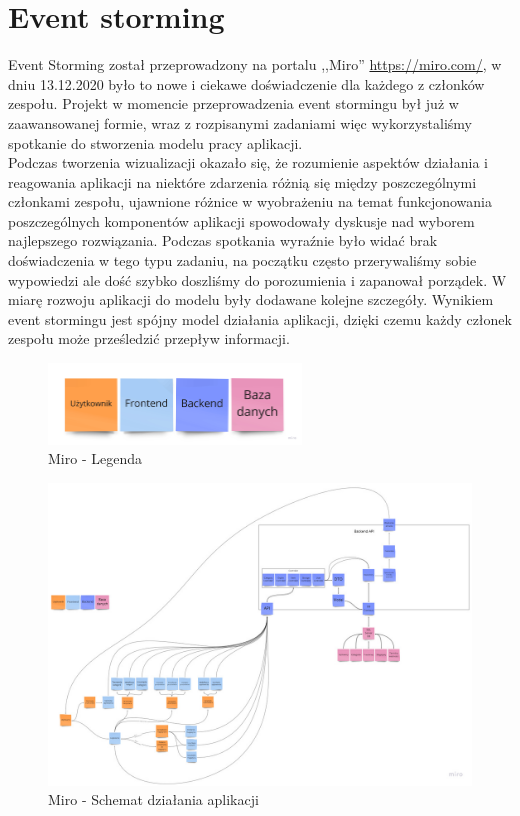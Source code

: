 \documentclass[12pt,a4paper]{article}
\begin{document}
	\section{Event storming}
		\indent Event Storming został przeprowadzony na portalu ,,Miro'' \url{https://miro.com/}, w dniu 13.12.2020 było to nowe i ciekawe doświadczenie dla każdego z członków zespołu.
		Projekt w momencie przeprowadzenia event stormingu był już w zaawansowanej formie, wraz z rozpisanymi zadaniami więc wykorzystaliśmy spotkanie
		do stworzenia modelu pracy aplikacji.\\
		\indent Podczas tworzenia wizualizacji okazało się, że rozumienie aspektów działania i reagowania aplikacji na niektóre zdarzenia
		różnią się między poszczególnymi członkami zespołu, ujawnione różnice w wyobrażeniu na temat funkcjonowania poszczególnych komponentów aplikacji spowodowały dyskusje
		nad wyborem najlepszego rozwiązania. Podczas spotkania wyraźnie było widać brak doświadczenia w tego typu zadaniu, na początku często przerywaliśmy sobie wypowiedzi ale dość szybko
		doszliśmy do porozumienia i zapanował porządek. W miarę rozwoju aplikacji do modelu były dodawane kolejne szczegóły. 
		Wynikiem event stormingu jest spójny model działania aplikacji, dzięki czemu każdy członek zespołu może prześledzić przepływ informacji.
		\begin{figure}[H]
			\centering
			\includegraphics[width=0.6\textwidth]{img/miro_2.jpg}
			\caption{Miro - Legenda}
			\label{fig:miro-legenda}
		\end{figure}				
		\begin{figure}[H]
			\centering
			\includegraphics[width=\textwidth]{img/miro_1.jpg}
			\caption{Miro - Schemat działania aplikacji}
			\label{fig:miro-ogolne}
		\end{figure}
\end{document}
